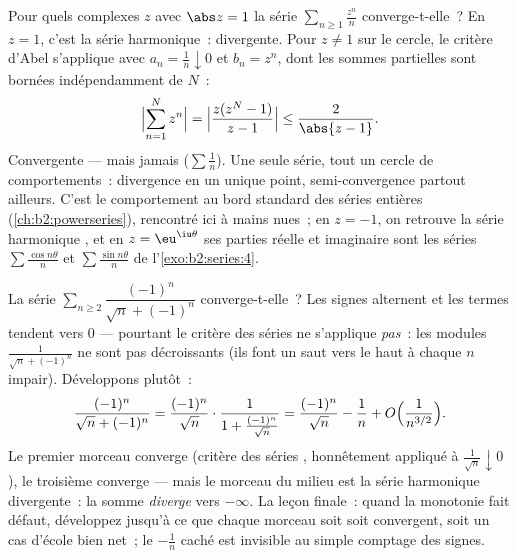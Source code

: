 \begin{example}\label{ex:b2:series:abelboundary}
Pour quels complexes $z$ avec $\abs z = 1$ la série $\sum_{n \geq 1}
\frac{z^n}{n}$ converge-t-elle~? En $z = 1$, c'est la série
harmonique~: divergente. Pour $z \neq 1$ sur le cercle, le critère
d'Abel s'applique avec $a_n = \frac1n \downarrow 0$ et $b_n = z^n$,
dont les sommes partielles sont bornées indépendamment de $N$~:
\[
\Bigl|\sum_{n=1}^{N} z^n\Bigr|
= \Bigl|\frac{z(z^N - 1)}{z - 1}\Bigr|
\leq \frac{2}{\abs{z - 1}} .
\]
Convergente --- mais jamais  ($\sum\frac1n$). Une seule
série, tout un cercle de comportements~: divergence en un unique
point, semi-convergence partout ailleurs. C'est le comportement au
bord standard des séries entières (\cref{ch:b2:powerseries}),
rencontré ici à mains nues~; en $z = -1$, on retrouve la série
harmonique , et en $z = \eu^{\iu\theta}$ ses parties réelle
et imaginaire sont les séries $\sum\frac{\cos n\theta}{n}$ et
$\sum\frac{\sin n\theta}{n}$ de l'\cref{exo:b2:series:4}.
\end{example}

\begin{example}\label{ex:b2:series:trap}
La série $\sum_{n\geq2} \dfrac{(-1)^n}{\sqrt n + (-1)^n}$
converge-t-elle~? Les signes alternent et les termes tendent vers
$0$ --- pourtant le critère des séries  ne s'applique
\emph{pas}~: les modules $\frac{1}{\sqrt n + (-1)^n}$ ne sont pas
décroissants (ils font un saut vers le haut à chaque $n$ impair).
Développons plutôt~:
\[
\frac{(-1)^n}{\sqrt n + (-1)^n}
= \frac{(-1)^n}{\sqrt n}\cdot
\frac{1}{1 + \frac{(-1)^n}{\sqrt n}}
= \frac{(-1)^n}{\sqrt n} - \frac{1}{n}
+ O\Bigl(\frac{1}{n^{3/2}}\Bigr).
\]
Le premier morceau converge (critère des séries ,
honnêtement appliqué à $\frac1{\sqrt n}\downarrow0$), le troisième
converge  --- mais le morceau du milieu est la série
harmonique divergente~: la somme \emph{diverge} vers $-\infty$. La
leçon finale~: quand la monotonie fait défaut, développez jusqu'à
ce que chaque morceau soit soit  convergent, soit un cas
d'école bien net~; le $-\frac1n$ caché est invisible au simple
comptage des signes.
\end{example}

